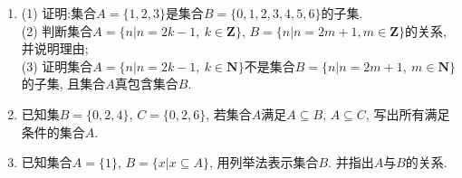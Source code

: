 \documentclass[10pt,a4paper]{article}
\begin{document}
\begin{enumerate}[1.]
\item (1) 证明:集合$A=\{1,2,3\}$是集合$B=\{0,1,2,3,4,5,6\}$的子集.\\
(2) 判断集合$A=\{n|n=2k-1,\ k\in \mathbf{Z}\}$, $B=\{n|n=2m+1,m\in \mathbf{Z}\}$的关系, 并说明理由;\\
(3) 证明集合$A=\{n|n=2k-1,\ k\in \mathbf{N}\}$不是集合$B=\{n|n=2m+1, \ m\in \mathbf{N}\}$的子集, 且集合$A$真包含集合$B$.
\item 已知集$B=\{0, 2, 4\}$, $C=\{0, 2, 6\}$, 若集合$A$满足$A\subseteq B$, $A\subseteq C$, 写出所有满足条件的集合$A$.
\item 已知集合$A=\{1\}$, $B=\{x|x\subseteq A\}$, 用列举法表示集合$B$. 并指出$A$与$B$的关系.


\iffalse






\end{enumerate}
\end{document}
